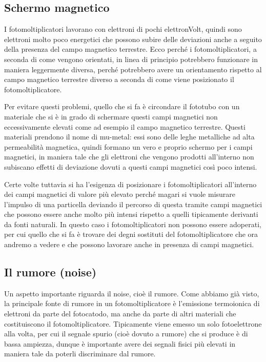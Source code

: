 \subsection{Schermo magnetico}

I fotomoltiplicatori lavorano con elettroni di pochi elettronVolt, quindi sono elettroni molto poco energetici che possono subire delle deviazioni anche a seguito della presenza del campo magnetico terrestre. Ecco perché i fotomoltiplicatori, a seconda di come vengono orientati, in linea di principio potrebbero funzionare in maniera leggermente diversa, perché potrebbero avere un orientamento rispetto al campo magnetico terrestre diverso a seconda di come viene posizionato il fotomoltiplicatore.

Per evitare questi problemi, quello che si fa è circondare il fototubo con un materiale che si è in grado di schermare questi campi magnetici non eccessivamente elevati come ad esempio il campo magnetico terrestre. Questi materiali prendono il nome di mu-metal: essi sono delle leghe metalliche ad alta permeabilità magnetica, quindi formano un vero e proprio schermo per i campi magnetici, in maniera tale che gli elettroni che vengono prodotti all'interno non subiscano effetti di deviazione dovuti a questi campi magnetici così poco intensi.

Certe volte tuttavia si ha l'esigenza di posizionare i fotomoltiplicatori all'interno dei campi magnetici di valore più elevato perché magari si vuole misurare l'impulso di una particella deviando il percorso di questa tramite campi magnetici che possono essere anche molto più intensi rispetto a quelli tipicamente derivanti da fonti naturali. In questo caso i fotomoltiplicatori non possono essere adoperati, per cui quello che si fa è trovare dei degni sostituti del fotomoltiplicatore che ora andremo a vedere e che possono lavorare anche in presenza di campi magnetici.

\subsection{Il rumore (noise)}
Un aspetto importante riguarda il noise, cioè il rumore. Come abbiamo già visto, la principale fonte di rumore in un fotomoltiplicatore è l'emissione termoionica di elettroni da parte del fotocatodo, ma anche da parte di altri materiali che costituiscono il fotomoltiplicatore. Tipicamente viene emesso un solo fotoelettrone alla volta, per cui il segnale spurio (cioè dovuto a rumore) che si produce è di bassa ampiezza, dunque è importante avere dei segnali fisici più elevati in maniera tale da poterli discriminare dal rumore.

